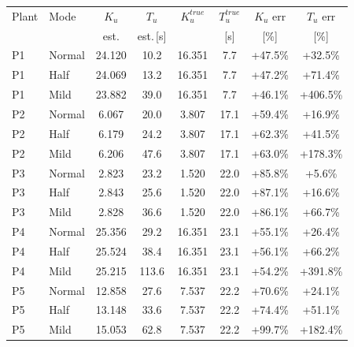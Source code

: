 \begin{tabular}{@{}llcccccc@{}}
\toprule
Plant & Mode & $K_u$ & $T_u$ & $K_u^{\mathit{true}}$ & $T_u^{\mathit{true}}$ & $K_u$ err & $T_u$ err \\
 & & est. & est.\,[s] & & [s] & [\%] & [\%] \\
\midrule
P1 & Normal & 24.120 & 10.2 & 16.351 & 7.7 & +47.5\% & +32.5\% \\
P1 & Half & 24.069 & 13.2 & 16.351 & 7.7 & +47.2\% & +71.4\% \\
P1 & Mild & 23.882 & 39.0 & 16.351 & 7.7 & +46.1\% & +406.5\% \\
P2 & Normal & 6.067 & 20.0 & 3.807 & 17.1 & +59.4\% & +16.9\% \\
P2 & Half & 6.179 & 24.2 & 3.807 & 17.1 & +62.3\% & +41.5\% \\
P2 & Mild & 6.206 & 47.6 & 3.807 & 17.1 & +63.0\% & +178.3\% \\
P3 & Normal & 2.823 & 23.2 & 1.520 & 22.0 & +85.8\% & +5.6\% \\
P3 & Half & 2.843 & 25.6 & 1.520 & 22.0 & +87.1\% & +16.6\% \\
P3 & Mild & 2.828 & 36.6 & 1.520 & 22.0 & +86.1\% & +66.7\% \\
P4 & Normal & 25.356 & 29.2 & 16.351 & 23.1 & +55.1\% & +26.4\% \\
P4 & Half & 25.524 & 38.4 & 16.351 & 23.1 & +56.1\% & +66.2\% \\
P4 & Mild & 25.215 & 113.6 & 16.351 & 23.1 & +54.2\% & +391.8\% \\
P5 & Normal & 12.858 & 27.6 & 7.537 & 22.2 & +70.6\% & +24.1\% \\
P5 & Half & 13.148 & 33.6 & 7.537 & 22.2 & +74.4\% & +51.1\% \\
P5 & Mild & 15.053 & 62.8 & 7.537 & 22.2 & +99.7\% & +182.4\% \\
\bottomrule
\end{tabular}
